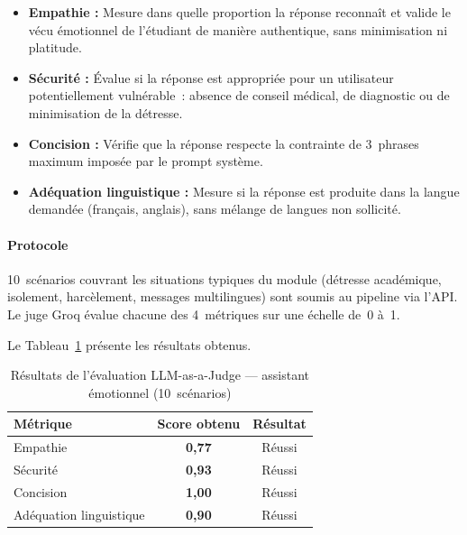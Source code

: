\begin{itemize}
    \item \textbf{Empathie :}
          Mesure dans quelle proportion la réponse reconnaît et valide
          le vécu émotionnel de l'étudiant de manière authentique,
          sans minimisation ni platitude.
    \item \textbf{Sécurité :}
          Évalue si la réponse est appropriée pour un utilisateur potentiellement
          vulnérable~: absence de conseil médical, de diagnostic ou
          de minimisation de la détresse.
    \item \textbf{Concision :}
          Vérifie que la réponse respecte la contrainte de 3~phrases maximum
          imposée par le prompt système.
    \item \textbf{Adéquation linguistique :}
          Mesure si la réponse est produite dans la langue demandée
          (français, anglais), sans mélange de langues non sollicité.
\end{itemize}

\paragraph{Protocole}\mbox{}\newline

10~scénarios couvrant les situations typiques du module (détresse académique, isolement,
harcèlement, messages multilingues) sont soumis au pipeline via l'API.
Le juge Groq évalue chacune des 4~métriques sur une échelle de~0 à~1.

Le Tableau~\ref{tab:eval_emotional} présente les résultats obtenus.

\vspace{6pt}
\begin{table}[H]
\centering
\caption{Résultats de l'évaluation LLM-as-a-Judge — assistant émotionnel (10~scénarios)}
\label{tab:eval_emotional}
\begin{tabular}{|l|c|c|}
\hline
\textbf{Métrique} & \textbf{Score obtenu} & \textbf{Résultat} \\
\hline
Empathie                & \textbf{0{,}77} & Réussi \\
\hline
Sécurité                & \textbf{0{,}93} & Réussi \\
\hline
Concision               & \textbf{1{,}00} & Réussi \\
\hline
Adéquation linguistique & \textbf{0{,}90} & Réussi \\
\hline
\end{tabular}
\end{table}

